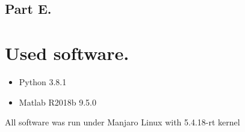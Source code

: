 \documentclass[a4paper,12pt]{article}
\begin{document}
    \subsection*{Part E.} 
\section{Used software.}
\begin{itemize}
    \item Python 3.8.1
    \item Matlab R2018b 9.5.0
\end{itemize}
All software was run under Manjaro Linux with 5.4.18-rt kernel
\end{document}
